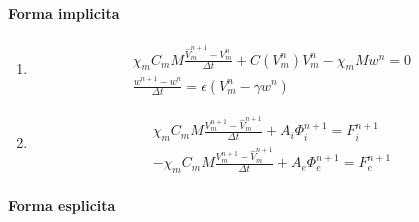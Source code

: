 \documentclass[a4paper]{article}
\theoremstyle{definition}
\begin{document}
\paragraph{Forma implicita}
\begin{enumerate}[label = \Roman*, align = Center]
\item 
   \begin{equation}
   \begin{gathered}
   \chi_m C_m M\frac{\hat{V}_m^{n+1} - V_m^n}{\Delta t} + C(V_m^n)V_m^n -\chi_mMw^n = 0
   \\
   \frac{w^{n+1}-w^n}{\Delta t} = \epsilon (V_m^n - \gamma w^n)
   \end{gathered}
   \end{equation}
\item 
   \begin{equation}
   \begin{gathered}
   \chi_m C_m M\frac{V_m^{n+1} - \hat{V}_m^{n+1}}{\Delta t} + A_i\Phi_i^{n+1} = F_i^{n+1} \\
   -\chi_m C_m M\frac{V_m^{n+1} - \hat{V}_m^{n+1}}{\Delta t} + A_e\Phi_e^{n+1} = F_e^{n+1}
   \end{gathered}
   \end{equation}
\end{enumerate}
\vspace{3mm}
\paragraph{Forma esplicita}
\end{document}
